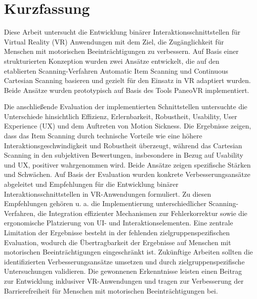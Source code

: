 \chapter{Kurzfassung}

Diese Arbeit untersucht die Entwicklung binärer Interaktionsschnittstellen für Virtual Reality (VR) Anwendungen mit dem Ziel, die Zugänglichkeit für Menschen mit motorischen Beeinträchtigungen zu verbessern. Auf Basis einer strukturierten Konzeption wurden zwei Ansätze entwickelt, die auf den etablierten Scanning-Verfahren Automatic Item Scanning und Continuous Cartesian Scanning basieren und gezielt für den Einsatz in VR adaptiert wurden. Beide Ansätze wurden prototypisch auf Basis des Tools PaneoVR implementiert.

Die anschließende Evaluation der implementierten Schnittstellen untersuchte die Unterschiede hinsichtlich Effizienz, Erlernbarkeit, Robustheit, Usability, User Experience (UX) und dem Auftreten von Motion Sickness. Die Ergebnisse zeigen, dass das Item Scanning durch technische Vorteile wie eine höhere Interaktionsgeschwindigkeit und Robustheit überzeugt, während das Cartesian Scanning in den subjektiven Bewertungen, insbesondere in Bezug auf Usability und UX, positiver wahrgenommen wird.
Beide Ansätze zeigen spezifische Stärken und Schwächen. Auf Basis der Evaluation wurden konkrete Verbesserungsansätze abgeleitet und Empfehlungen für die Entwicklung binärer Interaktionsschnittstellen in VR-Anwendungen formuliert. Zu diesen Empfehlungen gehören u. a. die Implementierung unterschiedlicher Scanning-Verfahren, die Integration effizienter Mechanismen zur Fehlerkorrektur sowie die ergonomische Platzierung von UI- und Interaktionselementen.
Eine zentrale Limitation der Ergebnisse besteht in der fehlenden zielgruppenspezifischen Evaluation, wodurch die Übertragbarkeit der Ergebnisse auf Menschen mit motorischen Beeinträchtigungen eingeschränkt ist. Zukünftige Arbeiten sollten die identifizierten Verbesserungsansätze umsetzen und durch zielgruppenspezifische Untersuchungen validieren. Die gewonnenen Erkenntnisse leisten einen Beitrag zur Entwicklung inklusiver VR-Anwendungen und tragen zur Verbesserung der Barrierefreiheit für Menschen mit motorischen Beeinträchtigungen bei.